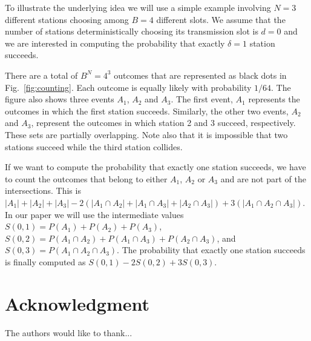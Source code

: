 \documentclass[journal]{IEEEtran}
\begin{document}
To illustrate the underlying idea we will use a simple example involving $N=3$ different stations choosing among $B=4$ different slots.
We assume that the number of stations deterministically choosing its transmission slot is $d=0$ and we are interested in computing the probability that exactly $\delta=1$ station succeeds.

There are a total of $B^N=4^3$ outcomes that are represented as black dots in Fig.~\ref{fig:counting}.
Each outcome is equally likely with probability $1/64$.
The figure also shows three events $A_1$, $A_2$ and $A_3$.
The first event, $A_1$ represents the outcomes in which the first station succeeds.
Similarly, the other two events, $A_2$ and $A_3$, represent the outcomes in which station 2 and 3 succeed, respectively.
These sets are partially overlapping.
Note also that it is impossible that two stations succeed while the third station collides.

If we want to compute the probability that exactly one station succeeds, we have to count the outcomes that belong to either $A_1$, $A_2$ or $A_3$ and are not part of the intersections.
This is $|A_1|+|A_2|+|A_3|-2(|A_1\cap A_2|+|A_1\cap A_3|+|A_2\cap A_3|)+3(|A_1\cap A_2\cap A_3|)$.
In our paper we will use the intermediate values
 $S(0,1)=P(A_1)+P(A_2)+P(A_3)$,
 $S(0,2)=P(A_1\cap A_2)+P(A_1\cap A_3)+P(A_2\cap A_3)$, and $S(0,3)=P(A_1\cap A_2\cap A_3)$.
 The probability that exactly one station succeeds is finally computed  as $S(0,1)-2S(0,2)+3S(0,3)$.



\section*{Acknowledgment}


The authors would like to thank...


\ifCLASSOPTIONcaptionsoff
  \newpage
\fi




\end{document}
